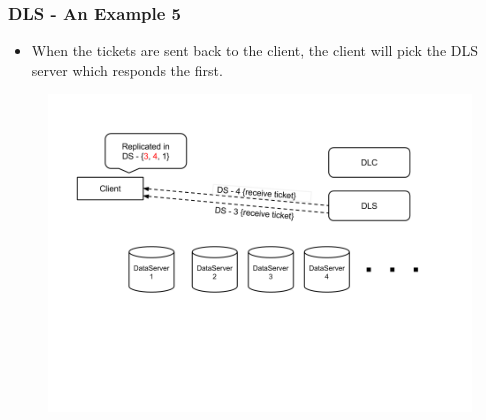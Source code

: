 \documentclass{beamer}
\begin{document}
\begin{frame}
  \frametitle{DLS - An Example 5}
  \begin{itemize}
  \item When the tickets are sent back to the client, the client will pick
    the DLS server which responds the first.
  \end{itemize}
  \begin{figure}
    \begin{center}
      \centerline{\includegraphics[scale=0.40]{img/DLS_Example6.png}}
    \end{center}
  \end{figure}

\end{frame}
\end{document}
